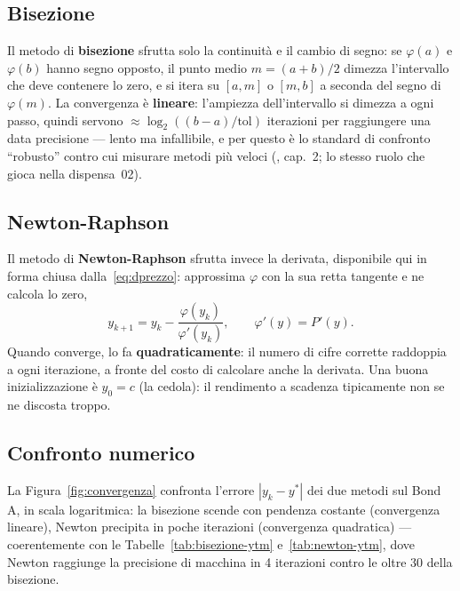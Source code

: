 \documentclass[11pt,a4paper]{article}
\theoremstyle{plain}
\theoremstyle{definition}
\theoremstyle{remark}
\newcommand{\abs}[1]{\left\lvert #1 \right\rvert}
\begin{document}
\subsection{Bisezione}

Il metodo di \textbf{bisezione} sfrutta solo la continuità e il cambio di segno: se
$\varphi(a)$ e $\varphi(b)$ hanno segno opposto, il punto medio $m=(a+b)/2$ dimezza
l'intervallo che deve contenere lo zero, e si itera su $[a,m]$ o $[m,b]$ a seconda del segno di
$\varphi(m)$. La convergenza è \textbf{lineare}: l'ampiezza dell'intervallo si dimezza a ogni
passo, quindi servono $\approx \log_2((b-a)/\mathrm{tol})$ iterazioni per raggiungere una data
precisione --- lento ma infallibile, e per questo è lo standard di confronto ``robusto'' contro
cui misurare metodi più veloci (\cite{burden2016}, cap.~2; lo stesso ruolo che gioca nella
dispensa~02).



\subsection{Newton-Raphson}

Il metodo di \textbf{Newton-Raphson} sfrutta invece la derivata, disponibile qui in forma
chiusa dalla~\eqref{eq:dprezzo}: approssima $\varphi$ con la sua retta tangente e ne calcola lo
zero,
\begin{equation}
  y_{k+1} = y_k - \frac{\varphi(y_k)}{\varphi'(y_k)}, \qquad \varphi'(y) = P'(y).
  \label{eq:newton-ytm}
\end{equation}
Quando converge, lo fa \textbf{quadraticamente}: il numero di cifre corrette raddoppia a ogni
iterazione, a fronte del costo di calcolare anche la derivata. Una buona inizializzazione è
$y_0 = c$ (la cedola): il rendimento a scadenza tipicamente non se ne discosta troppo.



\subsection{Confronto numerico}

La Figura~\ref{fig:convergenza} confronta l'errore $\abs{y_k-y^\ast}$ dei due metodi sul Bond A,
in scala logaritmica: la bisezione scende con pendenza costante (convergenza lineare), Newton
precipita in poche iterazioni (convergenza quadratica) --- coerentemente con le
Tabelle~\ref{tab:bisezione-ytm} e~\ref{tab:newton-ytm}, dove Newton raggiunge la precisione di
macchina in 4 iterazioni contro le oltre 30 della bisezione.
\end{document}
